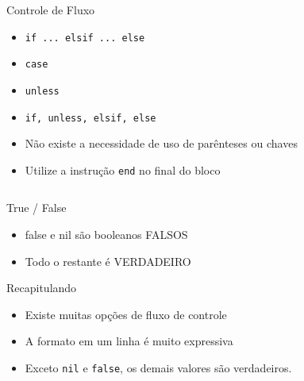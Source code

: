 
\begin{frame}{Controle de Fluxo}
  \begin{itemize}
    \item \verb!if ... elsif ... else!
    \item \verb!case!
    \item \verb!unless!
  \end{itemize}   
\pagebreak
  \begin{itemize}
    \item \verb!if, unless, elsif, else!
    \item Não existe a necessidade de uso de parênteses ou chaves
    \item Utilize a instrução \verb!end! no final do bloco
  \end{itemize}   
  \begin{columns}
    \begin{column}{0.5\textwidth}
    		  
    \end{column}
    \begin{column}{0.5\textwidth}
    		  
    \end{column}
  \end{columns}
\end{frame}

\begin{frame}[fragile,t]{True / False}
  \begin{itemize}
    \item false e nil são booleanos FALSOS
    \item Todo o restante é VERDADEIRO
	
  \end{itemize}   
\end{frame}


\begin{frame}[fragile,t]{Recapitulando}
  \begin{itemize}
    \item Existe muitas opções de fluxo de controle
    \item A formato em um linha é muito expressiva
    \item Exceto \verb!nil! e \verb!false!, os demais valores são verdadeiros.
  \end{itemize}
\end{frame}



